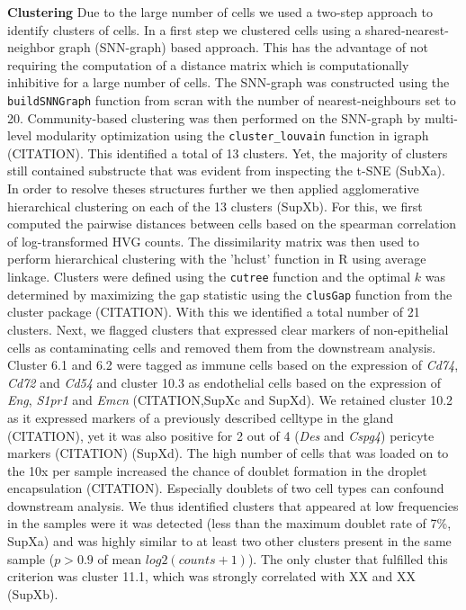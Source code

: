 \documentclass[titlepage, 12pt, oneside]{amsart}
\begin{document}
\textbf{Clustering}
Due to the large number of cells we used a two-step approach to identify clusters of cells.
In a first step we clustered cells using a shared-nearest-neighbor graph (SNN-graph) based approach.
This has the advantage of not requiring the computation of a distance matrix which is computationally inhibitive for a large number of cells.
The SNN-graph was constructed using the \texttt{buildSNNGraph} function from scran with the number of nearest-neighbours set to 20.
Community-based clustering was then performed on the SNN-graph by multi-level modularity optimization using the \texttt{cluster\_louvain} function in igraph (CITATION).
This identified a total of 13 clusters.
Yet, the majority of clusters still contained substructe that was evident from inspecting the t-SNE (SubXa).
In order to resolve theses structures further we then applied agglomerative hierarchical clustering on each of the 13 clusters (SupXb).
For this, we first computed the pairwise distances between cells based on the spearman correlation of log-transformed HVG counts.
The dissimilarity matrix was then used to perform hierarchical clustering with the 'hclust' function in R using average linkage.
Clusters were defined using the \texttt{cutree} function and the optimal $k$ was determined by maximizing the gap statistic using the \texttt{clusGap} function from the cluster package (CITATION).
With this we identified a total number of 21 clusters.
Next, we flagged clusters that expressed clear markers of non-epithelial cells as contaminating cells and removed them from the downstream analysis.
Cluster 6.1 and 6.2 were tagged as immune cells based on the expression of \textit{Cd74}, \textit{Cd72} and \textit{Cd54}\autocite{Scheele2017} and cluster 10.3 as endothelial cells based on the expression of \textit{Eng}, \textit{S1pr1} and \textit{Emcn} (CITATION,SupXc and SupXd).
We retained cluster 10.2 as it expressed markers of a previously described celltype in the gland (CITATION), yet it was also positive for 2 out of 4 (\textit{Des} and \textit{Cspg4}) pericyte markers (CITATION) (SupXd). 
The high number of cells that was loaded on to the 10x per sample increased the chance of doublet formation in the droplet encapsulation (CITATION).
Especially doublets of two cell types can confound downstream analysis.
We thus identified clusters that appeared at low frequencies in the samples were it was detected (less than the maximum doublet rate of 7\%, SupXa) and was highly similar to at least two other clusters present in the same sample ($p > 0.9$ of mean $log2(counts+1)$).
The only cluster that fulfilled this criterion was cluster 11.1, which was strongly correlated with XX and XX (SupXb).
\end{document}
